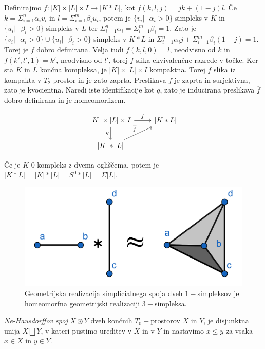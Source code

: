 \documentclass[mat1]{fmfdelo}
\begin{document}
\begin{dokaz}
    Definirajmo $f\colon |K|\times |L|\times I\rightarrow |K\ast L|$, kot $f(k,l,j)=jk+(1-j)l$. Če $k=\Sigma_{i=1}^n \alpha_i v_i$ in $l=\Sigma_{i=1}^m \beta_i u_i$, potem je $\{v_i|\text{ $\alpha_i > 0$}\}$ simpleks v $K$ in $\{u_i|\text{ $\beta_i > 0$}\}$ simpleks v $L$ ter $\Sigma_{i=1}^n \alpha_i = \Sigma_{i=1}^m \beta_i=1$. Zato je $\{v_i|\text{ $\alpha_i > 0$}\}\cup \{u_i|\text{ $\beta_i > 0$}\}$ simpleks v $K\ast L$  in $\Sigma_{i=1}^n \alpha_i j + \Sigma_{i=1}^m \beta_i (1-j)=1$. Torej je $f$ dobro definirana. Velja tudi $f(k,l,0)=l$, neodvisno od $k$ in $f(k',l',1)=k'$, neodvisno od $l'$, torej $f$ slika ekvivalenčne razrede v točke. Ker sta $K$ in $L$ končna kompleksa, je $|K|\times |L|\times I$ kompaktna. Torej $f$ slika iz kompakta v $T_2$ prostor in je zato zaprta. Preslikava $f$ je zaprta in surjektivna, zato je kvocientna. Naredi iste identifikacije kot $q$, zato je inducirana preslikava $\overline{f}$ dobro definirana in je homeomorfizem.
    
\[\begin{tikzcd}
    {|K|\times |L|\times I }\arrow{r}{f} \arrow[swap]{d}{q} & {|K\ast L|} \\
    {|K|\ast |L|} \arrow{ru}{\overline{f}}
   \end{tikzcd}
    \]


\end{dokaz}

Če je $K$ 0-kompleks z dvema ogliščema, potem je $|K\ast L|=|K|\ast |L|=S^0\ast |L| = \Sigma |L|$.

\begin{figure}[h]
    \centering
    \includegraphics[width=0.6\linewidth]{spoj.png}
    \caption{Geometrijska realizacija simplicialnega spoja dveh $1-$simpleksov je homeomorfna geometrijski realizaciji $3-$simpleksa.}
\end{figure}

\begin{definicija}
    \textit{Ne-Hausdorffov spoj} $X\circledast Y$ dveh končnih $T_0-$prostorov
     $X$ in $Y$, je disjunktna unija $X\bigsqcup Y$, v kateri
     pustimo ureditev v $X$ in v $Y$ in nastavimo $x\leq y$ za vsaka 
     $x\in X$ in $y\in Y$.
\end{definicija}
\end{document}
